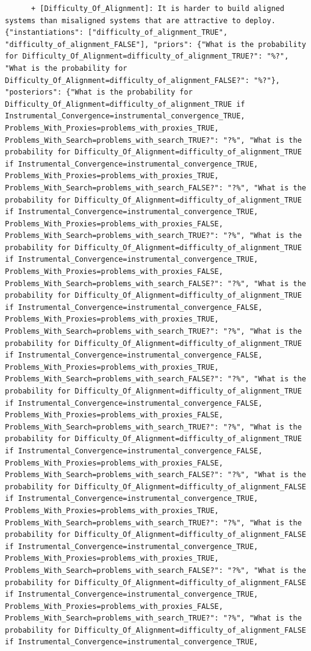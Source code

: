 \documentclass[
  11pt,
  letterpaper,
]{book}
\begin{document}
\begin{landscape}
\begin{verbatim}
      + [Difficulty_Of_Alignment]: It is harder to build aligned systems than misaligned systems that are attractive to deploy. {"instantiations": ["difficulty_of_alignment_TRUE", "difficulty_of_alignment_FALSE"], "priors": {"What is the probability for Difficulty_Of_Alignment=difficulty_of_alignment_TRUE?": "%?", "What is the probability for Difficulty_Of_Alignment=difficulty_of_alignment_FALSE?": "%?"}, "posteriors": {"What is the probability for Difficulty_Of_Alignment=difficulty_of_alignment_TRUE if Instrumental_Convergence=instrumental_convergence_TRUE, Problems_With_Proxies=problems_with_proxies_TRUE, Problems_With_Search=problems_with_search_TRUE?": "?%", "What is the probability for Difficulty_Of_Alignment=difficulty_of_alignment_TRUE if Instrumental_Convergence=instrumental_convergence_TRUE, Problems_With_Proxies=problems_with_proxies_TRUE, Problems_With_Search=problems_with_search_FALSE?": "?%", "What is the probability for Difficulty_Of_Alignment=difficulty_of_alignment_TRUE if Instrumental_Convergence=instrumental_convergence_TRUE, Problems_With_Proxies=problems_with_proxies_FALSE, Problems_With_Search=problems_with_search_TRUE?": "?%", "What is the probability for Difficulty_Of_Alignment=difficulty_of_alignment_TRUE if Instrumental_Convergence=instrumental_convergence_TRUE, Problems_With_Proxies=problems_with_proxies_FALSE, Problems_With_Search=problems_with_search_FALSE?": "?%", "What is the probability for Difficulty_Of_Alignment=difficulty_of_alignment_TRUE if Instrumental_Convergence=instrumental_convergence_FALSE, Problems_With_Proxies=problems_with_proxies_TRUE, Problems_With_Search=problems_with_search_TRUE?": "?%", "What is the probability for Difficulty_Of_Alignment=difficulty_of_alignment_TRUE if Instrumental_Convergence=instrumental_convergence_FALSE, Problems_With_Proxies=problems_with_proxies_TRUE, Problems_With_Search=problems_with_search_FALSE?": "?%", "What is the probability for Difficulty_Of_Alignment=difficulty_of_alignment_TRUE if Instrumental_Convergence=instrumental_convergence_FALSE, Problems_With_Proxies=problems_with_proxies_FALSE, Problems_With_Search=problems_with_search_TRUE?": "?%", "What is the probability for Difficulty_Of_Alignment=difficulty_of_alignment_TRUE if Instrumental_Convergence=instrumental_convergence_FALSE, Problems_With_Proxies=problems_with_proxies_FALSE, Problems_With_Search=problems_with_search_FALSE?": "?%", "What is the probability for Difficulty_Of_Alignment=difficulty_of_alignment_FALSE if Instrumental_Convergence=instrumental_convergence_TRUE, Problems_With_Proxies=problems_with_proxies_TRUE, Problems_With_Search=problems_with_search_TRUE?": "?%", "What is the probability for Difficulty_Of_Alignment=difficulty_of_alignment_FALSE if Instrumental_Convergence=instrumental_convergence_TRUE, Problems_With_Proxies=problems_with_proxies_TRUE, Problems_With_Search=problems_with_search_FALSE?": "?%", "What is the probability for Difficulty_Of_Alignment=difficulty_of_alignment_FALSE if Instrumental_Convergence=instrumental_convergence_TRUE, Problems_With_Proxies=problems_with_proxies_FALSE, Problems_With_Search=problems_with_search_TRUE?": "?%", "What is the probability for Difficulty_Of_Alignment=difficulty_of_alignment_FALSE if Instrumental_Convergence=instrumental_convergence_TRUE, 
\end{verbatim}
\end{landscape}
\end{document}
